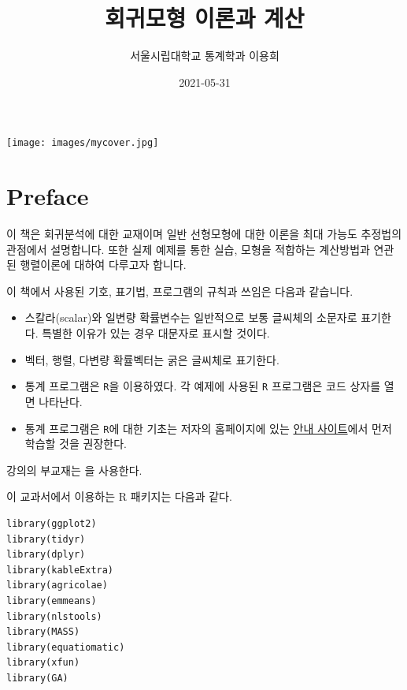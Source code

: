 \documentclass[
  10pt,
]{book}
\title{회귀모형 이론과 계산}
\author{서울시립대학교 통계학과 이용희}
\date{2021-05-31}
\makeatletter
\providecommand{\tightlist}{%
  \setlength{\itemsep}{0pt}\setlength{\parskip}{0pt}}
\newenvironment{kframe}{%
\medskip{}
\setlength{\fboxsep}{.8em}
 \def\at@end@of@kframe{}%
 \ifinner\ifhmode%
  \def\at@end@of@kframe{\end{minipage}}%
  \begin{minipage}{\columnwidth}%
 \fi\fi%
 \def\FrameCommand##1{\hskip\@totalleftmargin \hskip-\fboxsep
 \colorbox{shadecolor}{##1}\hskip-\fboxsep
     \hskip-\linewidth \hskip-\@totalleftmargin \hskip\columnwidth}%
 \MakeFramed {\advance\hsize-\width
   \@totalleftmargin\z@ \linewidth\hsize
   \@setminipage}}%
 {\par\unskip\endMakeFramed%
 \at@end@of@kframe}
\newenvironment{rmdblock}[1]
  {
  \begin{itemize}
  \renewcommand{\labelitemi}{
    \raisebox{-.7\height}[0pt][0pt]{
      {\setkeys{Gin}{width=3em,keepaspectratio}\texttt{[image: images/\#1]}}
    }
  }
  \setlength{\fboxsep}{1em}
  \begin{kframe}
  \item
  }
  {
  \end{kframe}
  \end{itemize}
  }
\newenvironment{rmdimportant}
  {\begin{rmdblock}{important}}
  {\end{rmdblock}}
\theoremstyle{definition}
\theoremstyle{definition}
\theoremstyle{definition}
\theoremstyle{definition}
\theoremstyle{remark}
\makeatother
\begin{document}
\maketitle

\thispagestyle{empty}
\begin{center}
\texttt{[image: images/mycover.jpg]}
\end{center}

\setlength{\abovedisplayskip}{-5pt}
\setlength{\abovedisplayshortskip}{-5pt}

{
\hypersetup{linkcolor=}
\setcounter{tocdepth}{1}
\tableofcontents
}
\listoftables
\listoffigures
\hypertarget{preface}{%
\chapter*{Preface}\label{preface}}


이 책은 회귀분석에 대한 교재이며 일반 선형모형에 대한 이론을 최대 가능도 추정법의 관점에서 설명합니다. 또한 실제 예제를 통한 실습, 모형을 적합하는 계산방법과 연관된 행렬이론에 대하여 다루고자 합니다.

\begin{rmdimportant}
이 책에서 사용된 기호, 표기법, 프로그램의 규칙과 쓰임은 다음과 같습니다.

\begin{itemize}
\tightlist
\item
  스칼라(scalar)와 일변량 확률변수는 일반적으로 보통 글씨체의 소문자로 표기한다. 특별한 이유가 있는 경우 대문자로 표시할 것이다.
\item
  벡터, 행렬, 다변량 확률벡터는 굵은 글씨체로 표기한다.
\item
  통계 프로그램은 \texttt{R}을 이용하였다. 각 예제에 사용된 \texttt{R} 프로그램은 코드 상자를 열면 나타난다.
\item
  통계 프로그램은 \texttt{R}에 대한 기초는 저자의 홈페이지에 있는 \href{https://ilovedata.github.io/computing/}{안내 사이트}에서 먼저 학습할 것을 권장한다.
\end{itemize}
\end{rmdimportant}

강의의 부교재는 \citet{kang2016you} 을 사용한다.

이 교과서에서 이용하는 R 패키지는 다음과 같다.

\begin{verbatim}
library(ggplot2)
library(tidyr)
library(dplyr)
library(kableExtra)
library(agricolae)
library(emmeans)
library(nlstools)
library(MASS)
library(equatiomatic)
library(xfun)
library(GA)
\end{verbatim}
\end{document}
